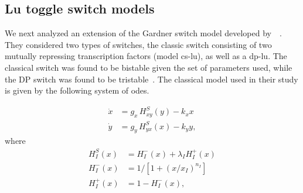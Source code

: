 {\begin{figure}[htbp]
\begin{center}
\end{center}
\end{figure}
\clearpage


\subsection{Lu toggle switch models}

We next analyzed an extension of the Gardner switch model developed by~\textcite{Lu:2014kc}~\autocite{Lu:2014kc}. They considered two types of switches, the classic switch consisting of two mutually repressing transcription factors (model \acrshort{cs-lu}), as well as a \acrfull{dp-lu}.  The classical switch was found to be bistable given the set of parameters used, while the DP switch was found to be tristable~\autocite{Lu:2014kc}. The classical model used in their study is given by the following system of \acrshort{ode}s.

\begin{align*}
\dot{x} & = g_{x}\, H^{S}_{xy}(y) -k_{x}x \\
\dot{y} & = g_{y}\,H^{S}_{yx}(x) -k_{y}y,
\end{align*}
where
\begin{align*}
H^{S}_{I}(x) &= H^{-}_{I}(x)+\lambda_{I}H^{+}_{I}(x) \\
H^{-}_{I}(x) &= 1 \big/\left[1+(x/x_{I})^{n_{I}}\right] \\
H^{+}_{I}(x) &= 1-H^{-}_{I}(x),
\end{align*}

}
